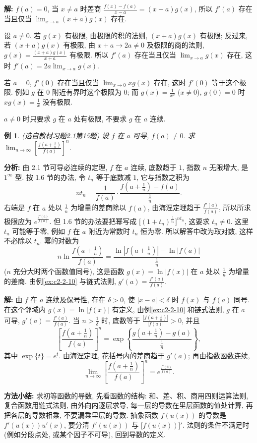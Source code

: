 \documentclass[UTF8,openany]{ctexbook}
\theoremstyle{chinesetextbook}
\newtheorem{example}{例}[section]
\newenvironment{cnsolution}{\par\indent\textbf{解:} \ignorespaces}{\par}
\begin{document}
\begin{cnsolution}
$f(a)=0$, 当 $x\ne a$ 时差商 $\displaystyle\frac{f(x)-f(a)}{x-a}=(x+a)g(x)$, 所以 $f'(a)$ 存在当且仅当 $\displaystyle\lim_{x\to a}(x+a)g(x)$ 存在.

设 $a\ne0$. 若 $g(x)$ 有极限, 由极限的积的法则, $(x+a)g(x)$ 有极限; 反过来, 若 $(x+a)g(x)$ 有极限, 由 $x+a\to2a\ne0$ 及极限的商的法则, $\displaystyle g(x)=\frac{(x+a)g(x)}{x+a}$ 有极限. 所以 $f'(a)$ 存在当且仅当 $\displaystyle\lim_{x\to a}g(x)$ 存在, 这时 $\displaystyle f'(a)=2a\lim_{x\to a}g(x)$.

若 $a=0$, $f'(0)$ 存在当且仅当 $\displaystyle\lim_{x\to0}xg(x)$ 存在, 这时 $f'(0)$ 等于这个极限. 例如 $g$ 在 $0$ 附近有界时这个极限为 $0$; 而 $\displaystyle g(x)=\frac1{x^2}$ ($x\ne0$), $g(0)=0$ 时 $\displaystyle xg(x)=\frac1x$ 没有极限.
\end{cnsolution}
$a\ne0$ 时只要求 $g$ 在 $a$ 处有极限, 不要求 $g$ 在 $a$ 连续.
\begin{example}\label{ex:c2-h1-15}
\textnormal{(选自教材习题2.1第15题)} 设 $f$ 在 $a$ 可导, $f(a)\ne0$. 求 $\displaystyle\lim_{n\to\infty}\left[\frac{f\left(a+\frac1n\right)}{f(a)}\right]^n$.
\end{example}
\par\indent\textbf{分析:} 由 2.1 节可导必连续的定理, $f$ 在 $a$ 连续, 底数趋于 $1$, 指数 $n$ 无限增大, 是 $1^\infty$ 型. 按 1.6 节的办法, 令 $t_n$ 等于底数减 $1$, 它与指数之积为
\[
nt_n=\frac1{f(a)}\cdot\frac{f\left(a+\frac1n\right)-f(a)}{\frac1n}.
\]
右端是 $f$ 在 $a$ 处以 $\displaystyle\frac1n$ 为增量的差商除以 $f(a)$, 由海涅定理趋于 $\displaystyle\frac{f'(a)}{f(a)}$, 所以所求极限应为 $e^{\frac{f'(a)}{f(a)}}$. 但 1.6 节的办法要把幂写成 $\bigl[(1+t_n)^{\frac1{t_n}}\bigr]^{nt_n}$, 这要求 $t_n\ne0$. 这里 $t_n$ 可能等于零, 例如 $f$ 在 $a$ 附近为常数时 $t_n$ 恒为零. 所以解答中改为取对数, 这样不必除以 $t_n$. 幂的对数为
\[
n\ln\frac{f\left(a+\frac1n\right)}{f(a)}=\frac{\ln\left|f\left(a+\frac1n\right)\right|-\ln|f(a)|}{\frac1n}
\]
($n$ 充分大时两个函数值同号), 这是函数 $g(x)=\ln|f(x)|$ 在 $a$ 处以 $\displaystyle\frac1n$ 为增量的差商. 由例\ref{ex:c2-2-10} 与链式法则, $\displaystyle g'(a)=\frac{f'(a)}{f(a)}$.
\begin{cnsolution}
由 $f$ 在 $a$ 连续及保号性, 存在 $\delta>0$, 使 $|x-a|<\delta$ 时 $f(x)$ 与 $f(a)$ 同号. 在这个邻域内 $g(x)=\ln|f(x)|$ 有定义, 由例\ref{ex:c2-2-10} 和链式法则, $g$ 在 $a$ 可导, $\displaystyle g'(a)=\frac{f'(a)}{f(a)}$. 当 $\displaystyle n>\frac1\delta$ 时, 底数等于 $\displaystyle\frac{\left|f\left(a+\frac1n\right)\right|}{|f(a)|}>0$, 并且
\[
\left[\frac{f\left(a+\frac1n\right)}{f(a)}\right]^n=\exp\left\{\frac{g\left(a+\frac1n\right)-g(a)}{\frac1n}\right\},
\]
其中 $\exp\{t\}=e^t$. 由海涅定理, 花括号内的差商趋于 $g'(a)$; 再由指数函数连续,
\[
\lim_{n\to\infty}\left[\frac{f\left(a+\frac1n\right)}{f(a)}\right]^n=e^{\frac{f'(a)}{f(a)}}.
\]
\end{cnsolution}
\par\indent\textbf{方法小结:} 求初等函数的导数, 先看函数的结构: 和、差、积、商用四则运算法则, 复合函数用链式法则, 由外向内逐层求导, 每一层的导数在里层函数的值处计算, 再把各层的导数相乘, 不要漏乘里层的导数. 抽象函数 $f(u(x))$ 的导数是 $f'(u(x))u'(x)$, 要分清 $f'(u(x))$ 与 $\bigl[f(u(x))\bigr]'$. 法则的条件不满足时 (例如分段点处, 或某个因子不可导), 回到导数的定义.
\end{document}
